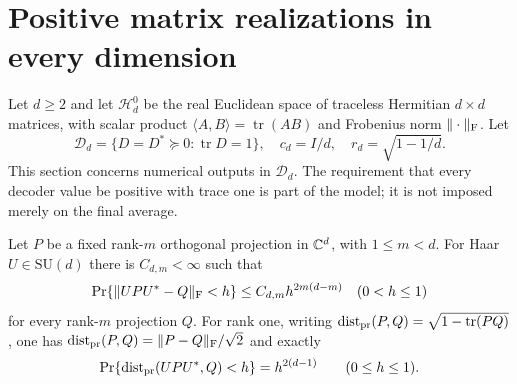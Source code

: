 \section{Positive matrix realizations in every dimension}\label{sec:matrix57}
Let $d\ge2$ and let $\mathcal H_d^0$ be the real Euclidean space of traceless Hermitian $d\times d$ matrices, with scalar product $\langle A,B\rangle=\operatorname{tr}(AB)$ and Frobenius norm $\|\cdot\|_{\rm F}$. Let
\[
 \mathcal D_d=\{D=D^*\succeq0:\operatorname{tr}D=1\},\quad
 c_d=I/d,\quad r_d=\sqrt{1-1/d}.
\]
This section concerns numerical outputs in $\mathcal D_d$. The requirement that every decoder value be positive with trace one is part of the model; it is not imposed merely on the final average.

\begin{lemma}\label{lem:grassmann57}
Let $P$ be a fixed rank-$m$ orthogonal projection in $\mathbb C^d$, with $1\le m<d$. For Haar $U\in\mathrm{SU}(d)$ there is $C_{d,m}<\infty$ such that
\[
 \Pr\{\|UPU^*-Q\|_{\rm F}<h\}\le C_{d,m}h^{2m(d-m)}\quad(0<h\le1)
\]
for every rank-$m$ projection $Q$. For rank one, writing
$\operatorname{dist}_{\rm pr}(P,Q)=\sqrt{1-\operatorname{tr}(PQ)}$, one has $\operatorname{dist}_{\rm pr}(P,Q)=\lVert P-Q\rVert_{\rm F}/\sqrt2$ and exactly
\begin{equation}\label{eq:projectivecap57}
 \Pr\{\operatorname{dist}_{\rm pr}(UPU^*,Q)<h\}=h^{2(d-1)}
                         \qquad(0\le h\le1).
\end{equation}
\end{lemma}
